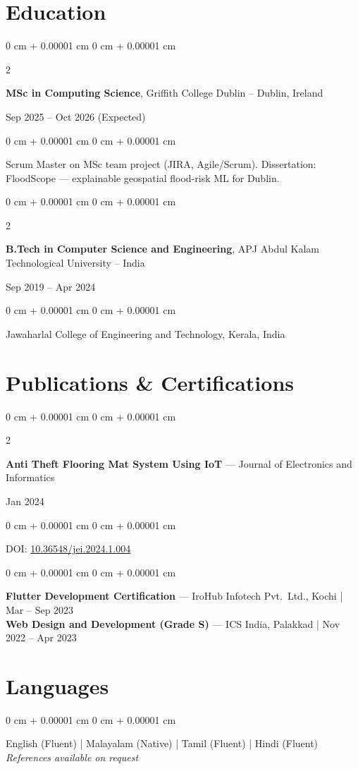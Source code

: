 \documentclass[10pt, a4paper]{article}
\newenvironment{onecolentry}{
    \begin{adjustwidth}{
        0 cm + 0.00001 cm
    }{
        0 cm + 0.00001 cm
    }
}{
    \end{adjustwidth}
}
\newenvironment{twocolentry}[2][]{
    \onecolentry
    \def\secondColumn{#2}
    \setcolumnwidth{\fill, 4.8 cm}
    \begin{paracol}{2}
}{
    \switchcolumn \raggedleft \secondColumn
    \end{paracol}
    \endonecolentry}
\let\hrefWithoutArrow\href
\begin{document}
    \section{Education}

    \begin{twocolentry}{
        Sep 2025 -- Oct 2026 (Expected)
    }
        \textbf{MSc in Computing Science}, Griffith College Dublin -- Dublin, Ireland
    \end{twocolentry}
    \vspace{0.05 cm}
    \begin{onecolentry}
        Scrum Master on MSc team project (JIRA, Agile/Scrum). Dissertation: FloodScope --- explainable geospatial flood-risk ML for Dublin.
    \end{onecolentry}

    \vspace{0.12 cm}

    \begin{twocolentry}{
        Sep 2019 -- Apr 2024
    }
        \textbf{B.Tech in Computer Science and Engineering}, APJ Abdul Kalam Technological University -- India
    \end{twocolentry}
    \vspace{0.05 cm}
    \begin{onecolentry}
        Jawaharlal College of Engineering and Technology, Kerala, India
    \end{onecolentry}

    \section{Publications \& Certifications}

    \begin{twocolentry}{
        Jan 2024
    }
        \textbf{Anti Theft Flooring Mat System Using IoT} --- Journal of Electronics and Informatics
    \end{twocolentry}
    \vspace{0.05 cm}
    \begin{onecolentry}
        DOI: \hrefWithoutArrow{https://doi.org/10.36548/jei.2024.1.004}{10.36548/jei.2024.1.004}
    \end{onecolentry}

    \vspace{0.10 cm}

    \begin{onecolentry}
        \textbf{Flutter Development Certification} --- IroHub Infotech Pvt.\ Ltd., Kochi | Mar -- Sep 2023\\
        \textbf{Web Design and Development (Grade S)} --- ICS India, Palakkad | Nov 2022 -- Apr 2023
    \end{onecolentry}

    \section{Languages}

    \begin{onecolentry}
        English (Fluent) | Malayalam (Native) | Tamil (Fluent) | Hindi (Fluent)\\
        \textit{References available on request}
    \end{onecolentry}
\end{document}
